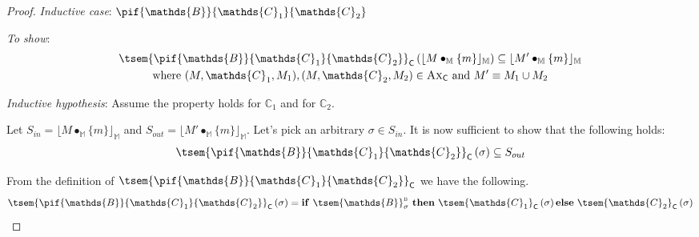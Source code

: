 {\begin{proof}
\textit{Inductive case}: $\pif{\mathds{B}}{\mathds{C}_1}{\mathds{C}_2}$

\textit{To show}:
\begin{gather*}
	\tsem{\pif{\mathds{B}}{\mathds{C}_1}{\mathds{C}_2}}_\mathsf{C} \left( \lfloor M \bullet_\mathbb{M} \{m\} \rfloor_\mathbb{M} \right) \subseteq \lfloor M' \bullet_\mathbb{M} \{m\} \rfloor_\mathbb{M}
	\\
	\text{where } (M, \mathds{C}_1, M_1), (M, \mathds{C}_2, M_2) \in \textsc{Ax}_\mathsf{C} \text{ and } M' \equiv M_1 \cup M_2
\end{gather*}

\textit{Inductive hypothesis}: Assume the property holds for $\mathds{C}_1$ and for $\mathds{C}_2$.

Let $S_{in} = \lfloor M \bullet_\mathbb{M} \{m\} \rfloor_\mathbb{M}$ and $S_{out} = \lfloor M' \bullet_\mathbb{M} \{m\} \rfloor_\mathbb{M}$. Let's pick an arbitrary $\sigma \in S_{in}$. It is now sufficient to show that the following holds:
\begin{gather*}
	\tsem{\pif{\mathds{B}}{\mathds{C}_1}{\mathds{C}_2}}_\mathsf{C} \left( \sigma \right) \subseteq S_{out}
\end{gather*}

From the definition of $\tsem{\pif{\mathds{B}}{\mathds{C}_1}{\mathds{C}_2}}_\mathsf{C}$ we have the following.
\[
	\tsem{\pif{\mathds{B}}{\mathds{C}_1}{\mathds{C}_2}}_\mathsf{C} \left( \sigma \right)
		= 
	\mathbf{if}\ \tsem{\mathds{B}}_\sigma^\textsc{b}\ \mathbf{then}\ \tsem{\mathds{C}_1}_\mathsf{C}\left( \sigma \right) \mathbf{else}\ \tsem{\mathds{C}_2}_\mathsf{C}\left( \sigma \right)
\]


\end{proof}}
